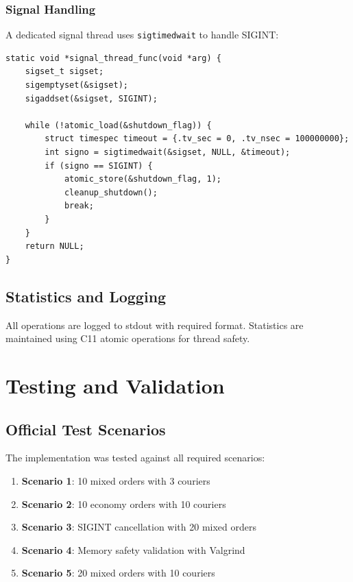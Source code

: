 \documentclass[12pt,a4paper]{article}
\begin{document}
\subsubsection{Signal Handling}

A dedicated signal thread uses \texttt{sigtimedwait} to handle SIGINT:

\begin{lstlisting}
static void *signal_thread_func(void *arg) {
    sigset_t sigset;
    sigemptyset(&sigset);
    sigaddset(&sigset, SIGINT);
    
    while (!atomic_load(&shutdown_flag)) {
        struct timespec timeout = {.tv_sec = 0, .tv_nsec = 100000000};
        int signo = sigtimedwait(&sigset, NULL, &timeout);
        if (signo == SIGINT) {
            atomic_store(&shutdown_flag, 1);
            cleanup_shutdown();
            break;
        }
    }
    return NULL;
}
\end{lstlisting}

\subsection{Statistics and Logging}

All operations are logged to stdout with required format. Statistics are maintained using C11 atomic operations for thread safety.

\section{Testing and Validation}

\subsection{Official Test Scenarios}

The implementation was tested against all required scenarios:

\begin{enumerate}
    \item \textbf{Scenario 1}: 10 mixed orders with 3 couriers
    \item \textbf{Scenario 2}: 10 economy orders with 10 couriers  
    \item \textbf{Scenario 3}: SIGINT cancellation with 20 mixed orders
    \item \textbf{Scenario 4}: Memory safety validation with Valgrind
    \item \textbf{Scenario 5}: 20 mixed orders with 10 couriers
\end{enumerate}
\end{document}
